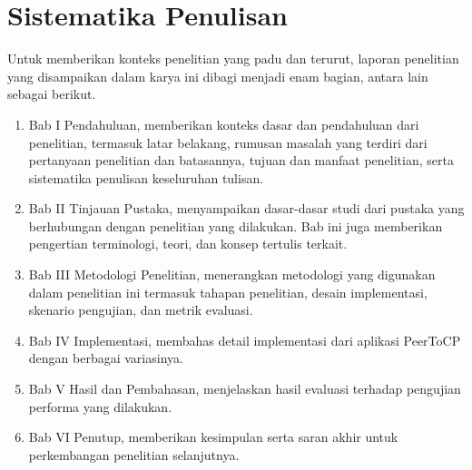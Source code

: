 \section{Sistematika Penulisan}

Untuk memberikan konteks penelitian yang padu dan terurut, laporan penelitian yang disampaikan dalam karya ini dibagi menjadi enam bagian, antara lain sebagai berikut.

\begin{enumerate}[noitemsep]
    \item Bab I Pendahuluan, memberikan konteks dasar dan pendahuluan dari penelitian, termasuk latar belakang, rumusan masalah yang terdiri dari pertanyaan penelitian dan batasannya, tujuan dan manfaat penelitian, serta sistematika penulisan keseluruhan tulisan.
    \item Bab II Tinjauan Pustaka, menyampaikan dasar-dasar studi dari pustaka yang berhubungan dengan penelitian yang dilakukan. Bab ini juga memberikan pengertian terminologi, teori, dan konsep tertulis terkait.
    \item Bab III Metodologi Penelitian, menerangkan metodologi yang digunakan dalam penelitian ini termasuk tahapan penelitian, desain implementasi, skenario pengujian, dan metrik evaluasi.
    \item Bab IV Implementasi, membahas detail implementasi dari aplikasi PeerToCP dengan berbagai variasinya.
    \item Bab V Hasil dan Pembahasan, menjelaskan hasil evaluasi terhadap pengujian performa yang dilakukan.
    \item Bab VI Penutup, memberikan kesimpulan serta saran akhir untuk perkembangan penelitian selanjutnya.
\end{enumerate}
